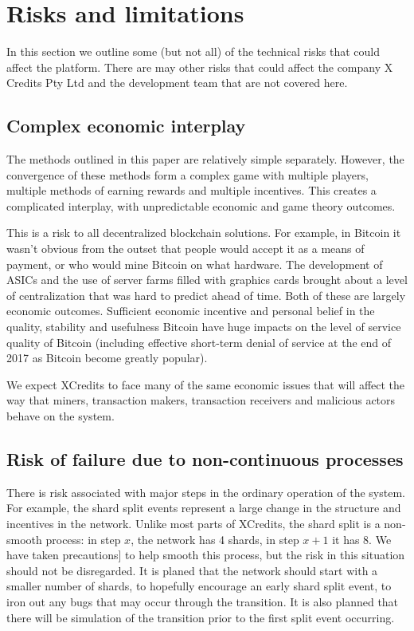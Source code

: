 \documentclass[a4paper,12pt]{article}
\begin{document}
\section{Risks and limitations}
In this section we outline some (but not all) of the technical risks that could affect the platform. There are may other risks that could affect the company X Credits Pty Ltd and the development team that are not covered here.

\subsection{Complex economic interplay}
The methods outlined in this paper are relatively simple separately. However, the convergence of these methods form a complex game with multiple players, multiple methods of earning rewards and multiple incentives. This creates a complicated interplay, with unpredictable economic and game theory outcomes. 

This is a risk to all decentralized blockchain solutions. For example, in Bitcoin it wasn't obvious from the outset that people would accept it as a means of payment, or who would mine Bitcoin on what hardware. The development of ASICs and the use of server farms filled with graphics cards brought about a level of centralization that was hard to predict ahead of time. Both of these are largely economic outcomes. Sufficient economic incentive and personal belief in the quality, stability and usefulness Bitcoin have huge impacts on the level of service quality of Bitcoin (including effective short-term denial of service at the end of 2017 as Bitcoin become greatly popular).

We expect XCredits to face many of the same economic issues that will affect the way that miners, transaction makers, transaction receivers and malicious actors behave on the system. 

\subsection{Risk of failure due to non-continuous processes}
There is risk associated with major steps in the ordinary operation of the system. For example, the shard split events represent a large change in the structure and incentives in the network. Unlike most parts of XCredits, the shard split is a non-smooth process: in step $x$, the network has 4 shards, in step $x+1$ it has 8. We have taken precautions] to help smooth this process, but the risk in this situation should not be disregarded. It is planed that the network should start with a smaller number of shards, to hopefully encourage an early shard split event, to iron out any bugs that may occur through the transition. It is also planned that there will be simulation of the transition prior to the first split event occurring. 
\end{document}

